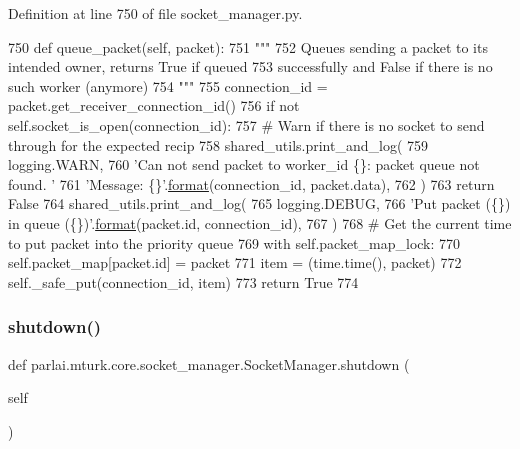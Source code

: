 Definition at line 750 of file socket\+\_\+manager.\+py.


\begin{DoxyCode}
750     \textcolor{keyword}{def }queue\_packet(self, packet):
751         \textcolor{stringliteral}{"""}
752 \textcolor{stringliteral}{        Queues sending a packet to its intended owner, returns True if queued}
753 \textcolor{stringliteral}{        successfully and False if there is no such worker (anymore)}
754 \textcolor{stringliteral}{        """}
755         connection\_id = packet.get\_receiver\_connection\_id()
756         \textcolor{keywordflow}{if} \textcolor{keywordflow}{not} self.socket\_is\_open(connection\_id):
757             \textcolor{comment}{# Warn if there is no socket to send through for the expected recip}
758             shared\_utils.print\_and\_log(
759                 logging.WARN,
760                 \textcolor{stringliteral}{'Can not send packet to worker\_id \{\}: packet queue not found. '}
761                 \textcolor{stringliteral}{'Message: \{\}'}.\hyperlink{namespaceparlai_1_1chat__service_1_1services_1_1messenger_1_1shared__utils_a32e2e2022b824fbaf80c747160b52a76}{format}(connection\_id, packet.data),
762             )
763             \textcolor{keywordflow}{return} \textcolor{keyword}{False}
764         shared\_utils.print\_and\_log(
765             logging.DEBUG,
766             \textcolor{stringliteral}{'Put packet (\{\}) in queue (\{\})'}.\hyperlink{namespaceparlai_1_1chat__service_1_1services_1_1messenger_1_1shared__utils_a32e2e2022b824fbaf80c747160b52a76}{format}(packet.id, connection\_id),
767         )
768         \textcolor{comment}{# Get the current time to put packet into the priority queue}
769         with self.packet\_map\_lock:
770             self.packet\_map[packet.id] = packet
771         item = (time.time(), packet)
772         self.\_safe\_put(connection\_id, item)
773         \textcolor{keywordflow}{return} \textcolor{keyword}{True}
774 
\end{DoxyCode}
\mbox{\label{classparlai_1_1mturk_1_1core_1_1socket__manager_1_1SocketManager_ac98d9330dbc0bcfad53a7a66c09fb56a}} 
\subsubsection{\texorpdfstring{shutdown()}{shutdown()}}
{\footnotesize\ttfamily def parlai.\+mturk.\+core.\+socket\+\_\+manager.\+Socket\+Manager.\+shutdown (\begin{DoxyParamCaption}\item[{}]{self }\end{DoxyParamCaption})}

